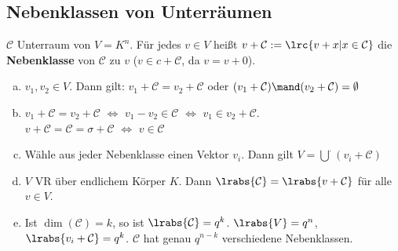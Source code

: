 	\subsection{Nebenklassen von Unterräumen}
		$ \mathcal{C} $ Unterraum von $ V=K^n $. Für jedes $ v\in V $ heißt $ v+\mathcal{C}:=\lrc{v+x|x\in \mathcal{C}} $ die \textbf{Nebenklasse} von $\mathcal{C}$ zu $ v $ ($ v\in c+ \mathcal{C} $, da $ v=v+0 $).
		\begin{enumerate}[a)]
			\item $ v_1,v_2\in V $. Dann gilt: $ v_1+ \mathcal{C}=v_2+\mathcal{C} $ oder $ (v_1+\mathcal{C})\mand(v_2+\mathcal{C})=\emptyset $
			\item $ v_1+\mathcal{C}=v_2+\mathcal{C} $ $ \Leftrightarrow $ $ v_1-v_2\in \mathcal{C} $ $ \Leftrightarrow $ $ v_1\in v_2+ \mathcal{C} $.\\
			$ v+\mathcal{C}=\mathcal{C}=\sigma+\mathcal{C} $ $ \Leftrightarrow $ $ v\in \mathcal{C} $
			\item Wähle aus jeder Nebenklasse einen Vektor $ v_i $. Dann gilt $ V=\overset{\cdot}{\bigcup}(v_i+\mathcal{C}) $
			\item  $ V $ VR über endlichem Körper $ K $. Dann $ \lrabs{\mathcal{C}}=\lrabs{v+\mathcal{C}} $ für alle $ v\in V $.
			\item Ist $ \dim(\mathcal{C})=k $, so ist $ \lrabs{\mathcal{C}}=q^k $. $ \lrabs{V}=q^n $, $ \lrabs{v_i+\mathcal{C}}=q^k $. $ \mathcal{C} $ hat genau $ q^{n-k} $ verschiedene Nebenklassen.
		\end{enumerate}

